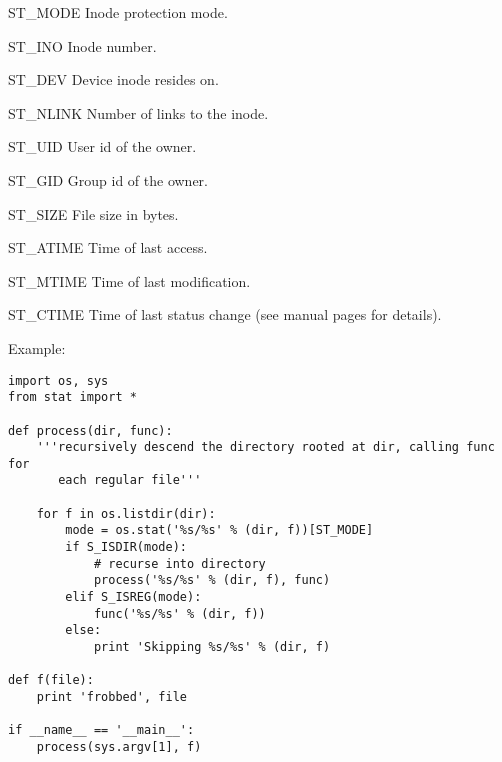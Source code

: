 \begin{datadesc}{ST_MODE}
Inode protection mode.
\end{datadesc}

\begin{datadesc}{ST_INO}
Inode number.
\end{datadesc}

\begin{datadesc}{ST_DEV}
Device inode resides on.
\end{datadesc}

\begin{datadesc}{ST_NLINK}
Number of links to the inode.
\end{datadesc}

\begin{datadesc}{ST_UID}
User id of the owner.
\end{datadesc}

\begin{datadesc}{ST_GID}
Group id of the owner.
\end{datadesc}

\begin{datadesc}{ST_SIZE}
File size in bytes.
\end{datadesc}

\begin{datadesc}{ST_ATIME}
Time of last access.
\end{datadesc}

\begin{datadesc}{ST_MTIME}
Time of last modification.
\end{datadesc}

\begin{datadesc}{ST_CTIME}
Time of last status change (see manual pages for details).
\end{datadesc}

Example:

\begin{verbatim}
import os, sys
from stat import *

def process(dir, func):
    '''recursively descend the directory rooted at dir, calling func for
       each regular file'''

    for f in os.listdir(dir):
        mode = os.stat('%s/%s' % (dir, f))[ST_MODE]
        if S_ISDIR(mode):
            # recurse into directory
            process('%s/%s' % (dir, f), func)
        elif S_ISREG(mode):
            func('%s/%s' % (dir, f))
        else:
            print 'Skipping %s/%s' % (dir, f)

def f(file):
    print 'frobbed', file

if __name__ == '__main__':
    process(sys.argv[1], f)
\end{verbatim}
